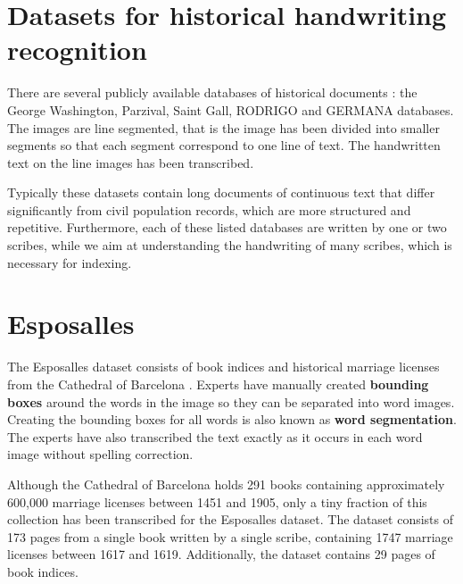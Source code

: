 \section{Datasets for historical handwriting recognition}

There are several publicly available databases of historical documents \cite{esposalles}: the George Washington, Parzival, Saint Gall, RODRIGO and GERMANA databases. The images are line segmented, that is the image has been divided into smaller segments so that each segment correspond to one line of text. The handwritten text on the line images has been transcribed.

Typically these datasets contain long documents of continuous text that differ significantly from civil population records, which are more structured and repetitive. Furthermore, each of these listed databases are written by one or two scribes, while we aim at understanding the handwriting of many scribes, which is necessary for indexing.

\section{Esposalles}
The Esposalles dataset consists of book indices and historical marriage licenses from the Cathedral of Barcelona \cite{esposalles}.
Experts have manually created \textbf{bounding boxes} around the words in the image so they can be separated into word images. Creating the bounding boxes for all words is also known as \textbf{word segmentation}.
The experts have also transcribed the text exactly as it occurs in each word image without spelling correction.

Although the Cathedral of Barcelona holds 291 books containing approximately 600,000 marriage licenses between 1451 and 1905, only a tiny fraction of this collection has been transcribed for the Esposalles dataset. The dataset consists of 173 pages from a single book written by a single scribe, containing 1747 marriage licenses between 1617 and 1619. Additionally, the dataset contains 29 pages of book indices.

